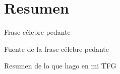 %
%
%
%
%

\chapter{Resumen}

\begin{FraseCelebre}
\begin{Frase}
Frase célebre pedante
\end{Frase}
\begin{Fuente}
Fuente de la frase célebre pedante
\end{Fuente}
\end{FraseCelebre}

Resumen de lo que hago en mi TFG

\endinput
